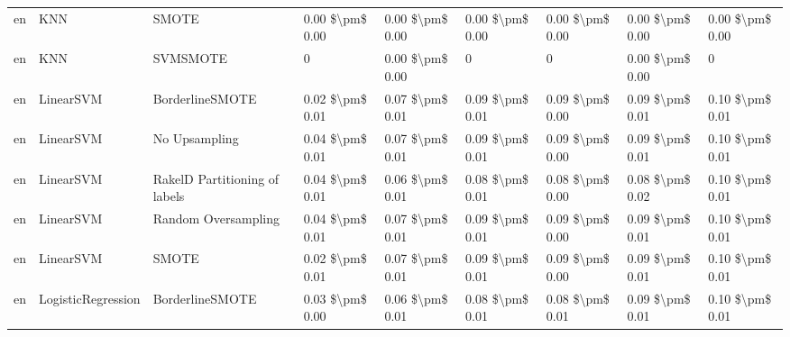 \begin{tabular}{lllllllll}
      en &                             KNN &                         SMOTE & 0.00 \$\textbackslash pm\$ 0.00 &           0.00 \$\textbackslash pm\$ 0.00 &       0.00 \$\textbackslash pm\$ 0.00 &        0.00 \$\textbackslash pm\$ 0.00 &                         0.00 \$\textbackslash pm\$ 0.00 &     0.00 \$\textbackslash pm\$ 0.00 \\
      en &                             KNN &                      SVMSMOTE &               0 &           0.00 \$\textbackslash pm\$ 0.00 &                     0 &                      0 &                         0.00 \$\textbackslash pm\$ 0.00 &                   0 \\
      en &                       LinearSVM &               BorderlineSMOTE & 0.02 \$\textbackslash pm\$ 0.01 &           0.07 \$\textbackslash pm\$ 0.01 &       0.09 \$\textbackslash pm\$ 0.01 &        0.09 \$\textbackslash pm\$ 0.00 &                         0.09 \$\textbackslash pm\$ 0.01 &     0.10 \$\textbackslash pm\$ 0.01 \\
      en &                       LinearSVM &                 No Upsampling & 0.04 \$\textbackslash pm\$ 0.01 &           0.07 \$\textbackslash pm\$ 0.01 &       0.09 \$\textbackslash pm\$ 0.01 &        0.09 \$\textbackslash pm\$ 0.00 &                         0.09 \$\textbackslash pm\$ 0.01 &     0.10 \$\textbackslash pm\$ 0.01 \\
      en &                       LinearSVM & RakelD Partitioning of labels & 0.04 \$\textbackslash pm\$ 0.01 &           0.06 \$\textbackslash pm\$ 0.01 &       0.08 \$\textbackslash pm\$ 0.01 &        0.08 \$\textbackslash pm\$ 0.00 &                         0.08 \$\textbackslash pm\$ 0.02 &     0.10 \$\textbackslash pm\$ 0.01 \\
      en &                       LinearSVM &           Random Oversampling & 0.04 \$\textbackslash pm\$ 0.01 &           0.07 \$\textbackslash pm\$ 0.01 &       0.09 \$\textbackslash pm\$ 0.01 &        0.09 \$\textbackslash pm\$ 0.00 &                         0.09 \$\textbackslash pm\$ 0.01 &     0.10 \$\textbackslash pm\$ 0.01 \\
      en &                       LinearSVM &                         SMOTE & 0.02 \$\textbackslash pm\$ 0.01 &           0.07 \$\textbackslash pm\$ 0.01 &       0.09 \$\textbackslash pm\$ 0.01 &        0.09 \$\textbackslash pm\$ 0.00 &                         0.09 \$\textbackslash pm\$ 0.01 &     0.10 \$\textbackslash pm\$ 0.01 \\
      en &              LogisticRegression &               BorderlineSMOTE & 0.03 \$\textbackslash pm\$ 0.00 &           0.06 \$\textbackslash pm\$ 0.01 &       0.08 \$\textbackslash pm\$ 0.01 &        0.08 \$\textbackslash pm\$ 0.01 &                         0.09 \$\textbackslash pm\$ 0.01 &     0.10 \$\textbackslash pm\$ 0.01 \\

\end{tabular}
